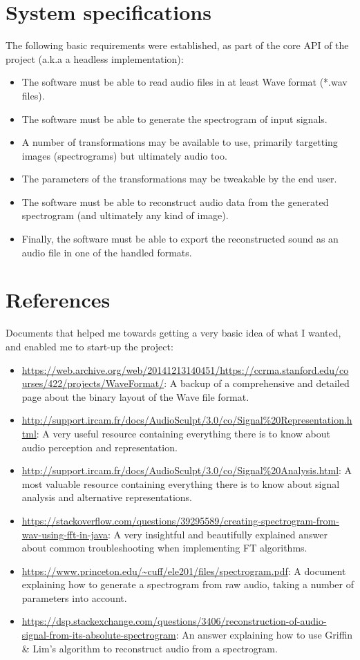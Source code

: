 \documentclass{article}
\begin{document}
\section{System specifications}
    The following basic requirements were established, as part of the core API of the project (a.k.a a headless implementation):
    \begin{itemize}
        \item The software must be able to read audio files in at least Wave format (*.wav files).
        \item The software must be able to generate the spectrogram of input signals.
        \item A number of transformations may be available to use, primarily targetting images (spectrograms) but ultimately audio too.
        \item The parameters of the transformations may be tweakable by the end user.
        \item The software must be able to reconstruct audio data from the generated spectrogram (and ultimately any kind of image).
        \item Finally, the software must be able to export the reconstructed sound as an audio file in one of the handled formats.
    \end{itemize}

\section{References}
    Documents that helped me towards getting a very basic idea of what I wanted, and enabled me to start-up the project:\\
    \begin{itemize}
        \item \url{https://web.archive.org/web/20141213140451/https://ccrma.stanford.edu/courses/422/projects/WaveFormat/}: A backup of a comprehensive and detailed page about the binary layout of the Wave file format.
        \item \url{http://support.ircam.fr/docs/AudioSculpt/3.0/co/Signal%20Representation.html}: A very useful resource containing everything there is to know about audio perception and representation.
        \item \url{http://support.ircam.fr/docs/AudioSculpt/3.0/co/Signal%20Analysis.html}: A most valuable resource containing everything there is to know about signal analysis and alternative representations.
        \item \url{https://stackoverflow.com/questions/39295589/creating-spectrogram-from-wav-using-fft-in-java}: A very insightful and beautifully explained answer about common troubleshooting when implementing FT algorithms.
        \item \url{https://www.princeton.edu/~cuff/ele201/files/spectrogram.pdf}: A document explaining how to generate a spectrogram from raw audio, taking a number of parameters into account.
        \item \url{https://dsp.stackexchange.com/questions/3406/reconstruction-of-audio-signal-from-its-absolute-spectrogram}: An answer explaining how to use Griffin & Lim's algorithm to reconstruct audio from a spectrogram.
    \end{itemize}
\end{document}
